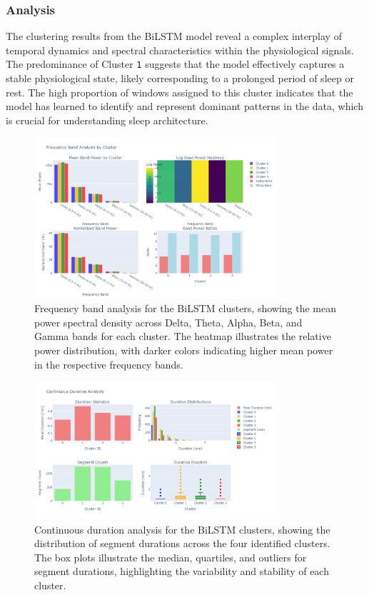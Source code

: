\documentclass[a4paper,12pt,twoside]{article}
\begin{document}
\subsubsection{Analysis}

The clustering results from the BiLSTM model reveal a complex interplay of temporal dynamics and spectral characteristics within the physiological signals. The predominance of Cluster \texttt{1} suggests that the model effectively captures a stable physiological state, likely corresponding to a prolonged period of sleep or rest. The high proportion of windows assigned to this cluster indicates that the model has learned to identify and represent dominant patterns in the data, which is crucial for understanding sleep architecture.


\begin{figure}[H]
\centering
\includegraphics[width=0.8\textwidth]{img/bilstm frequency band analysis.png}
\caption{Frequency band analysis for the BiLSTM clusters, showing the mean power spectral density across Delta, Theta, Alpha, Beta, and Gamma bands for each cluster. The heatmap illustrates the relative power distribution, with darker colors indicating higher mean power in the respective frequency bands.}
\label{fig:bilstm_frequency_band_analysis}
\end{figure}

\begin{figure}[H]
\centering
\includegraphics[width=0.8\textwidth]{img/bilstm continous duration plots.png}
\caption{Continuous duration analysis for the BiLSTM clusters, showing the distribution of segment durations across the four identified clusters. The box plots illustrate the median, quartiles, and outliers for segment durations, highlighting the variability and stability of each cluster.}
\label{fig:bilstm_continuous_duration_analysis}
\end{figure}
\end{document}
